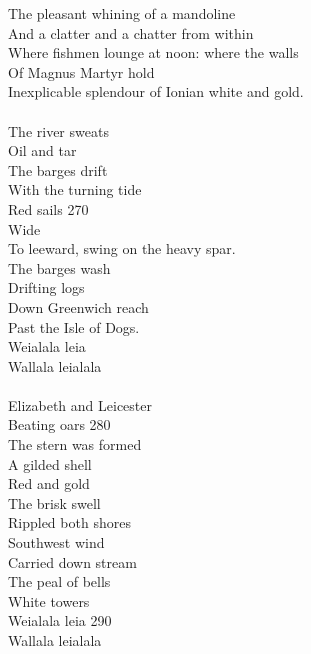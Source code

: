\documentclass{article}
\begin{document}
The pleasant whining of a mandoline \\
And a clatter and a chatter from within \\
Where fishmen lounge at noon: where the walls \\
Of Magnus Martyr hold \\
Inexplicable splendour of Ionian white and gold. \\
 \\
\indent     The river sweats \\
\indent     Oil and tar \\
\indent     The barges drift \\
\indent     With the turning tide \\
\indent     Red sails                                                   \hfill 270 \\
\indent     Wide \\
\indent     To leeward, swing on the heavy spar. \\
\indent     The barges wash \\
\indent     Drifting logs \\
\indent     Down Greenwich reach \\
\indent     Past the Isle of Dogs. \\
\indent\indent          Weialala leia \\
\indent\indent          Wallala leialala \\
 \\
\indent     Elizabeth and Leicester \\
\indent     Beating oars                                                \hfill 280 \\
\indent     The stern was formed \\
\indent     A gilded shell \\
\indent     Red and gold \\
\indent     The brisk swell \\
\indent     Rippled both shores \\
\indent     Southwest wind \\
\indent     Carried down stream \\
\indent     The peal of bells \\
\indent     White towers \\
\indent\indent          Weialala leia                                          \hfill 290 \\
\indent\indent          Wallala leialala \\
 \\
\end{document}
